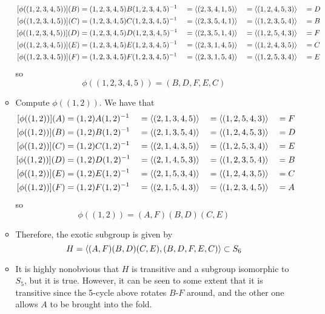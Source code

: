 \documentclass[../notes.tex]{subfiles}
\begin{document}
\begin{itemize}
\begin{itemize}
\begin{alignat*}{4}
            [\phi((1,2,3,4,5))](B) &= (1,2,3,4,5)B(1,2,3,4,5)^{-1}& &= \left\langle{(2,3,4,1,5)}\right\rangle& &= \left\langle{(1,2,4,5,3)}\right\rangle& &= D\\
            [\phi((1,2,3,4,5))](C) &= (1,2,3,4,5)C(1,2,3,4,5)^{-1}& &= \left\langle{(2,3,5,4,1)}\right\rangle& &= \left\langle{(1,2,3,5,4)}\right\rangle& &= B\\
            [\phi((1,2,3,4,5))](D) &= (1,2,3,4,5)D(1,2,3,4,5)^{-1}& &= \left\langle{(2,3,5,1,4)}\right\rangle& &= \left\langle{(1,2,5,4,3)}\right\rangle& &= F\\
            [\phi((1,2,3,4,5))](E) &= (1,2,3,4,5)E(1,2,3,4,5)^{-1}& &= \left\langle{(2,3,1,4,5)}\right\rangle& &= \left\langle{(1,2,4,3,5)}\right\rangle& &= C\\
            [\phi((1,2,3,4,5))](F) &= (1,2,3,4,5)F(1,2,3,4,5)^{-1}& &= \left\langle{(2,3,1,5,4)}\right\rangle& &= \left\langle{(1,2,5,3,4)}\right\rangle& &= E
        \end{alignat*}
        so
        \begin{equation*}
            \phi((1,2,3,4,5)) = (B,D,F,E,C)
        \end{equation*}
        \item Compute $\phi((1,2))$. We have that
        \begin{alignat*}{4}
            [\phi((1,2))](A) &= (1,2)A(1,2)^{-1}& &= \left\langle{(2,1,3,4,5)}\right\rangle& &= \left\langle{(1,2,5,4,3)}\right\rangle& &= F\\
            [\phi((1,2))](B) &= (1,2)B(1,2)^{-1}& &= \left\langle{(2,1,3,5,4)}\right\rangle& &= \left\langle{(1,2,4,5,3)}\right\rangle& &= D\\
            [\phi((1,2))](C) &= (1,2)C(1,2)^{-1}& &= \left\langle{(2,1,4,3,5)}\right\rangle& &= \left\langle{(1,2,5,3,4)}\right\rangle& &= E\\
            [\phi((1,2))](D) &= (1,2)D(1,2)^{-1}& &= \left\langle{(2,1,4,5,3)}\right\rangle& &= \left\langle{(1,2,3,5,4)}\right\rangle& &= B\\
            [\phi((1,2))](E) &= (1,2)E(1,2)^{-1}& &= \left\langle{(2,1,5,3,4)}\right\rangle& &= \left\langle{(1,2,4,3,5)}\right\rangle& &= C\\
            [\phi((1,2))](F) &= (1,2)F(1,2)^{-1}& &= \left\langle{(2,1,5,4,3)}\right\rangle& &= \left\langle{(1,2,3,4,5)}\right\rangle& &= A
        \end{alignat*}
        so
        \begin{equation*}
            \phi((1,2)) = (A,F)(B,D)(C,E)
        \end{equation*}
        \item Therefore, the exotic subgroup is given by
        \begin{equation*}
            H = \left\langle{(A,F)(B,D)(C,E),(B,D,F,E,C)}\right\rangle \subset S_6
        \end{equation*}
        \item It is highly nonobvious that $H$ is transitive and a subgroup isomorphic to $S_5$, but it is true. However, it can be seen to some extent that it is transitive since the 5-cycle above rotates $B$-$F$ around, and the other one allows $A$ to be brought into the fold.

\end{itemize}
\end{itemize}
\end{document}
